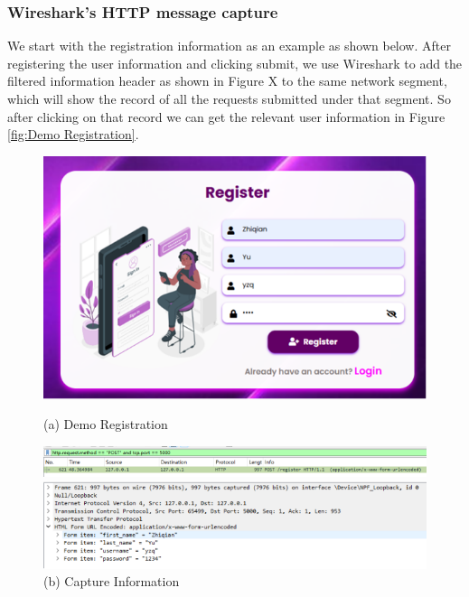 \documentclass{article}
\begin{document}
\subsubsection{Wireshark's HTTP message capture}
We start with the registration information as an example as shown below. After registering the user information and clicking submit, we use Wireshark to add the filtered information header as shown in Figure X to the same network segment, which will show the record of all the requests submitted under that segment. 
So after clicking on that record we can get the relevant user information in Figure \ref{fig:Demo Registration}.
\begin{figure}[H]
    \centering
    \begin{minipage}{0.5\textwidth}
        \centering
        \includegraphics[width=\textwidth]{images/Demo_Registration.png}
        \caption*{(a) Demo Registration}
    \end{minipage}
    \hfill
    \begin{minipage}{0.5\textwidth}
        \centering
        \includegraphics[width=\textwidth]{images/Capture_Information.png}
        \caption*{(b) Capture Information}
    \end{minipage}
    \hfill
    \begin{minipage}{0.5\textwidth}
        \centering
        \includegraphics[width=\textwidth]{images/Information_content.png}

\end{minipage}
\end{figure}
\end{document}
